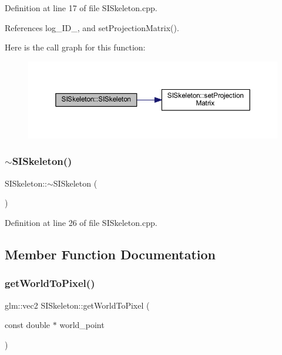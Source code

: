 Definition at line 17 of file S\+I\+Skeleton.\+cpp.



References log\+\_\+\+I\+D\+\_\+, and set\+Projection\+Matrix().

Here is the call graph for this function\+:
\nopagebreak
\begin{figure}[H]
\begin{center}
\leavevmode
\includegraphics[width=350pt]{classSISkeleton_a3d968efd0700f20a93064957f15bf40e_cgraph}
\end{center}
\end{figure}
\mbox{\label{classSISkeleton_a6e9f780999700a4695d4ed487f2499b9}} 
\subsubsection{\texorpdfstring{$\sim$\+S\+I\+Skeleton()}{~SISkeleton()}}
{\footnotesize\ttfamily S\+I\+Skeleton\+::$\sim$\+S\+I\+Skeleton (\begin{DoxyParamCaption}{ }\end{DoxyParamCaption})}



Definition at line 26 of file S\+I\+Skeleton.\+cpp.



\subsection{Member Function Documentation}
\mbox{\label{classSISkeleton_adbd224633ac2e4c0285cf2cf760cc42a}} 
\subsubsection{\texorpdfstring{get\+World\+To\+Pixel()}{getWorldToPixel()}}
{\footnotesize\ttfamily glm\+::vec2 S\+I\+Skeleton\+::get\+World\+To\+Pixel (\begin{DoxyParamCaption}\item[{const double $\ast$}]{world\+\_\+point }\end{DoxyParamCaption})\hspace{0.3cm}{\ttfamily [protected]}}



